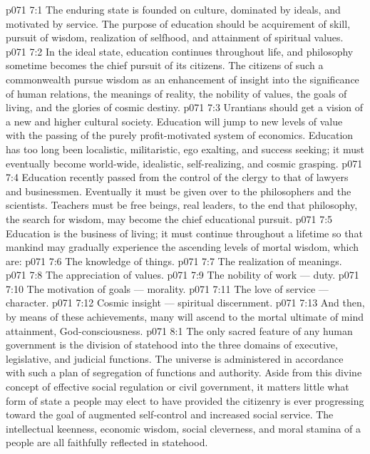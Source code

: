 \vs p071 7:1 The enduring state is founded on culture, dominated by ideals, and motivated by service. The purpose of education should be acquirement of skill, pursuit of wisdom, realization of selfhood, and attainment of spiritual values.
\vs p071 7:2 In the ideal state, education continues throughout life, and philosophy sometime becomes the chief pursuit of its citizens. The citizens of such a commonwealth pursue wisdom as an enhancement of insight into the significance of human relations, the meanings of reality, the nobility of values, the goals of living, and the glories of cosmic destiny.
\vs p071 7:3 Urantians should get a vision of a new and higher cultural society. Education will jump to new levels of value with the passing of the purely profit\hyp{}motivated system of economics. Education has too long been localistic, militaristic, ego exalting, and success seeking; it must eventually become world\hyp{}wide, idealistic, self\hyp{}realizing, and cosmic grasping.
\vs p071 7:4 Education recently passed from the control of the clergy to that of lawyers and businessmen. Eventually it must be given over to the philosophers and the scientists. Teachers must be free beings, real leaders, to the end that philosophy, the search for wisdom, may become the chief educational pursuit.
\vs p071 7:5 Education is the business of living; it must continue throughout a lifetime so that mankind may gradually experience the ascending levels of mortal wisdom, which are:
\vs p071 7:6 \bibnobreakspace The knowledge of things.
\vs p071 7:7 \bibnobreakspace The realization of meanings.
\vs p071 7:8 \bibnobreakspace The appreciation of values.
\vs p071 7:9 \bibnobreakspace The nobility of work --- duty.
\vs p071 7:10 \bibnobreakspace The motivation of goals --- morality.
\vs p071 7:11 \bibnobreakspace The love of service --- character.
\vs p071 7:12 \bibnobreakspace Cosmic insight --- spiritual discernment.
\vs p071 7:13 \pc And then, by means of these achievements, many will ascend to the mortal ultimate of mind attainment, God\hyp{}consciousness.
\vs p071 8:1 The only sacred feature of any human government is the division of statehood into the three domains of executive, legislative, and judicial functions. The universe is administered in accordance with such a plan of segregation of functions and authority. Aside from this divine concept of effective social regulation or civil government, it matters little what form of state a people may elect to have provided the citizenry is ever progressing toward the goal of augmented self\hyp{}control and increased social service. The intellectual keenness, economic wisdom, social cleverness, and moral stamina of a people are all faithfully reflected in statehood.

